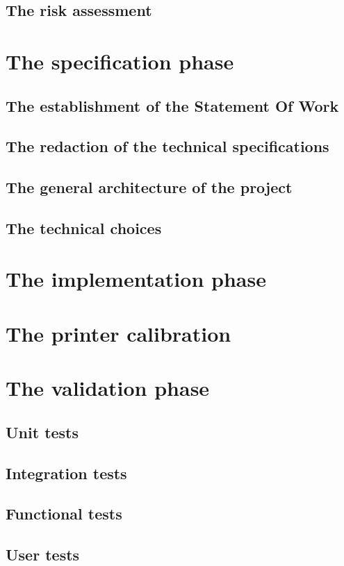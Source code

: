 \documentclass{report}
\begin{document}
\section{The risk assessment}

\chapter{The specification phase}

\section{The establishment of the Statement Of Work}

\section{The redaction of the technical specifications}

\section{The general architecture of the project}

\section{The technical choices}

\chapter{The implementation phase}

\chapter{The printer calibration}

\chapter{The validation phase}

\section{Unit tests}

\section{Integration tests}

\section{Functional tests}

\section{User tests}


\appendix
\end{document}
